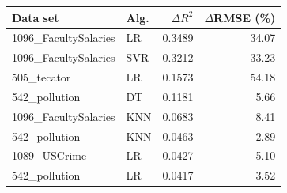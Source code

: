 \begin{tabular}{llrr}
\toprule
\textbf{Data set} & \textbf{Alg.} & \textbf{$\Delta R^2$} & \textbf{$\Delta$RMSE (\%)} \\
\midrule
1096\_FacultySalaries & LR & 0.3489 & 34.07 \\
1096\_FacultySalaries & SVR & 0.3212 & 33.23 \\
505\_tecator & LR & 0.1573 & 54.18 \\
542\_pollution & DT & 0.1181 & 5.66 \\
1096\_FacultySalaries & KNN & 0.0683 & 8.41 \\
542\_pollution & KNN & 0.0463 & 2.89 \\
1089\_USCrime & LR & 0.0427 & 5.10 \\
542\_pollution & LR & 0.0417 & 3.52 \\
\bottomrule
\end{tabular}
